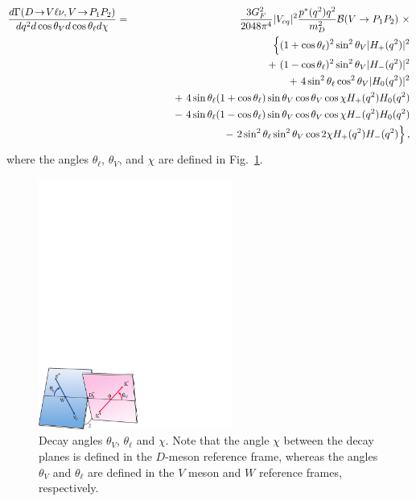 \begin{eqnarray}
\frac{d\Gamma(D\ra V\ell\nu, V\ra P_1P_2)}{dq^2 d\cos\theta_V d\cos\theta_\ell d\chi} 
 &  = & \frac{3G_F^2}{2048\pi^4}
       |V_{cq}|^2 \frac{p^*(q^2)q^2}{m_D^2} {\cal B}(V\to P_1P_2)\ \times \nonumber \\ 
 & & \hskip0.10in \Big\{ (1 + \cos\theta_\ell)^2 \sin^2\theta_V |H_+(q^2)|^2 \nonumber \\
 & & \hskip0.20in +\ (1 - \cos\theta_\ell)^2 \sin^2\theta_V |H_-(q^2)|^2 \nonumber \\
 & & \hskip0.30in +\ 4\sin^2\theta_\ell\cos^2\theta_V|H_0(q^2)|^2 \nonumber \\
 & & \hskip0.40in +\ 4\sin\theta_\ell (1 + \cos\theta_\ell) 
             \sin\theta_V \cos\theta_V \cos\chi H_+(q^2) H_0(q^2) \nonumber \\
 & & \hskip0.50in -\ 4\sin\theta_\ell (1 - \cos\theta_\ell) 
          \sin\theta_V \cos\theta_V \cos\chi H_-(q^2) H_0(q^2) \nonumber \\
 & & \hskip0.60in -\ 2\sin^2\theta_\ell \sin^2\theta_V 
                \cos 2\chi H_+(q^2) H_-(q^2) \Big\}\,,
\label{eq:dGammaVector}
\end{eqnarray}
where the angles $\theta^{}_\ell$, $\theta^{}_V$, and $\chi$ are defined
in Fig.~\ref{DecayAngles}. 

\begin{figure}[htbp]
  \begin{center}
\includegraphics[width=2.5in, bb=0 0 320 200]{figures/charm/sl_Widhalm07_3.pdf}
  \end{center}
  \caption{
    Decay angles $\theta_V$, $\theta_\ell$ 
    and $\chi$. Note that the angle $\chi$ between the decay
    planes is defined in the $D$-meson reference frame, whereas
    the angles $\theta^{}_V$ and $\theta^{}_\ell$ are defined
    in the $V$ meson and $W$ reference frames, respectively.}
  \label{DecayAngles}
\end{figure}

